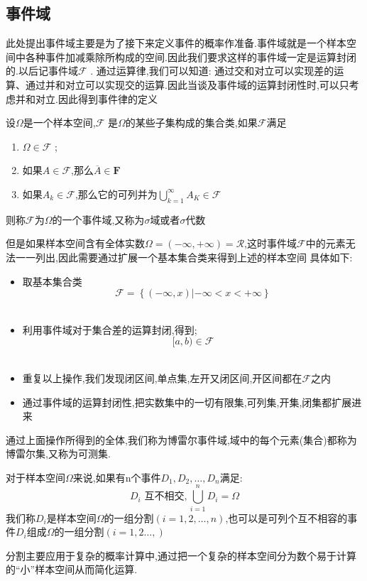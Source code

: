 \subsection{事件域}
此处提出事件域主要是为了接下来定义事件的概率作准备.事件域就是一个样本空间中各种事件加减乘除所构成的空间.因此我们要求这样的事件域一定是运算封闭的.以后记事件域\(\mathcal{F}\) . 通过运算律,我们可以知道: 通过交和对立可以实现差的运算、通过并和对立可以实现交的运算.因此当谈及事件域的运算封闭性时,可以只考虑并和对立.因此得到事件律的定义
\begin{Definition}
    设\(\Omega\)是一个样本空间,\(\mathcal{F}\) 是\(\Omega\)的某些子集构成的集合类,如果\(\mathcal{F}\)满足
    \begin{enumerate}
        \item \(\Omega \in \mathcal{F}\) ; \\
        \item 如果\(A \in \mathcal{F}\),那么\(\overline{A} \in \mathbf{F}\) \\
        \item 如果\(A_k \in \mathcal{F}\),那么它的可列并为\(\bigcup\limits_{k=1}^{\infty} A_K \in \mathcal{F}\)
    \end{enumerate}
则称\(\mathcal{F}\)为\(\Omega\)的一个事件域,又称为\(\sigma\)域或者\(\sigma\)代数
\end{Definition}
但是如果样本空间含有全体实数\(\Omega=(-\infty,+\infty)=\mathcal{R}\),这时事件域\(\mathcal{F}\)中的元素无法一一列出,因此需要通过扩展一个基本集合类来得到上述的样本空间
具体如下:
\begin{itemize}
    \item 取基本集合类\[\mathcal{F} =\left\{(-\infty ,x)| -\infty < x< +\infty \right\}\]\\
    \item 利用事件域对于集合差的运算封闭,得到;\[[a,b) \in \mathcal{F}\] \\
    \item 重复以上操作,我们发现闭区间,单点集,左开又闭区间,开区间都在\(\mathcal{F}\)之内 \\
    \item 通过事件域的运算封闭性,把实数集中的一切有限集,可列集,开集,闭集都扩展进来
\end{itemize}

通过上面操作所得到的全体,我们称为博雷尔事件域,域中的每个元素(集合)都称为博雷尔集,又称为可测集.
\begin{Definition}[样本空间的分割]
    对于样本空间\(\Omega\)来说,如果有n个事件\(D_1,D_2,\dots,D_n\)满足:\[D_i\text{ 互不相交},\bigcup\limits_{i=1}^n D_i = \Omega\] 我们称\(D_i\)是样本空间\(\Omega\)的一组分割\((i=1,2,\dots , n )\),也可以是可列个互不相容的事件\(D_i\)组成\(\Omega\)的一组分割\((i=1,2\dots ,)\)
\end{Definition}
分割主要应用于复杂的概率计算中,通过把一个复杂的样本空间分为数个易于计算的“小”样本空间从而简化运算.